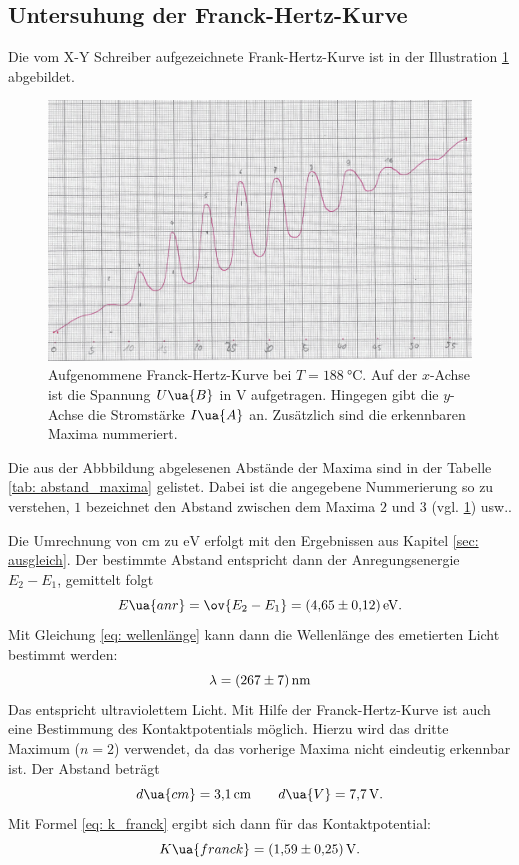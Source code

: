 \subsection{Untersuhung der Franck-Hertz-Kurve}\label{sec: frank}
\FloatBarrier
Die vom X-Y Schreiber aufgezeichnete Frank-Hertz-Kurve ist in der Illustration \ref{fig: messkurve_frank_hertz} abgebildet.
\begin{figure}
  \centering
  \includegraphics[width=0.8 \textwidth]{./pics/frank_hertz_kurve.png}
  \caption{Aufgenommene Franck-Hertz-Kurve bei $T=\SI{188}{\celsius}$. Auf der $x$-Achse ist die Spannung $U\ua{B}$ in $\si{\volt}$ aufgetragen.
          Hingegen gibt die $y$-Achse die Stromstärke $I\ua{A}$ an. Zusätzlich sind die erkennbaren Maxima nummeriert.}
  \label{fig: messkurve_frank_hertz}
\end{figure}
Die aus der Abbbildung abgelesenen Abstände der Maxima sind in der Tabelle \ref{tab: abstand_maxima} gelistet.
Dabei ist die angegebene Nummerierung so zu verstehen, $1$ bezeichnet den Abstand zwischen dem Maxima $2$ und $3$ (vgl. \ref{fig: messkurve_frank_hertz}) usw..

Die Umrechnung von $\si{\centi\meter}$ zu $\si{\eV}$ erfolgt mit den Ergebnissen aus Kapitel \ref{sec: ausgleich}.
Der bestimmte Abstand entspricht dann der Anregungsenergie $E_2-E_1$, gemittelt folgt
\begin{equation}
  \label{eq:austrittarbeit}
E\ua{anr}=\ov{E_2-E_1}=\SI{4.65\pm0.12}{\eV}.
\end{equation}
Mit Gleichung \eqref{eq: wellenlänge} kann dann die Wellenlänge des emetierten Licht bestimmt werden:
\begin{equation}
  \label{eq: lambda}
  \lambda=\SI{267\pm7}{\nano\meter}
\end{equation}
Das entspricht ultraviolettem Licht.
Mit Hilfe der Franck-Hertz-Kurve ist auch eine Bestimmung des Kontaktpotentials
möglich. Hierzu wird das dritte Maximum ($n=2$) verwendet, da das vorherige Maxima
nicht eindeutig erkennbar ist. Der Abstand beträgt
\begin{equation*}
  d\ua{cm}=\SI{3.1}{\centi\meter} \qquad d\ua{V}=\SI{7.7}{\volt}.
\end{equation*}
Mit Formel \eqref{eq: k_franck} ergibt sich dann für das Kontaktpotential:
\begin{equation}
  \label{eq:k_frank}
  K\ua{franck}= \SI{1.59\pm0.25}{\volt}.
\end{equation}
\FloatBarrier
